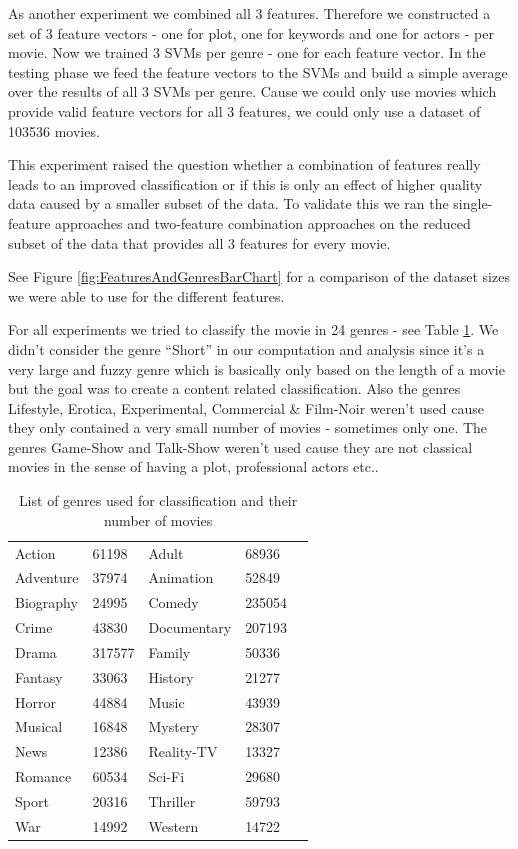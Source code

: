 \documentclass{vldb}
\begin{document}
\par As another experiment we combined all 3 features. Therefore we constructed a set of 3 feature vectors - one for plot, one for keywords and one for actors - per movie. Now we trained 3 SVMs per genre - one for each feature vector. In the testing phase we feed the feature vectors to the SVMs and build a simple average over the results of all 3 SVMs per genre. Cause we could only use movies which provide valid feature vectors for all 3 features, we could only use a dataset of 103536 movies.

\par This experiment raised the question whether a combination of features really leads to an improved classification or if this is only an effect of higher quality data caused by a smaller subset of the data. To validate this we ran the single-feature approaches and two-feature combination approaches on the reduced subset of the data that provides all 3 features for every movie.

\par See Figure \ref{fig:FeaturesAndGenresBarChart} for a comparison of the dataset sizes we were able to use for the different features.

\par For all experiments we tried to classify the movie in 24 genres - see Table \ref{genre-list}. We didn't consider the genre “Short” in our computation and analysis since it's a very large and fuzzy genre which is basically only based on the length of a movie but the goal was to create a content related classification. Also the genres Lifestyle, Erotica, Experimental, Commercial \& Film-Noir weren't used cause they only contained a very small number of movies - sometimes only one. The genres Game-Show and Talk-Show weren't used cause they are not classical movies in the sense of having a plot, professional actors etc..

\begin{table}[]
\centering
\caption{List of genres used for classification and their number of movies}
\label{genre-list}
\begin{tabular}{lllll}
Action & 61198 & Adult & 68936\\
Adventure & 37974 & Animation & 52849\\
Biography & 24995 & Comedy & 235054\\
Crime & 43830 & Documentary & 207193\\
Drama & 317577 & Family & 50336\\
Fantasy & 33063 & History & 21277\\
Horror & 44884 & Music & 43939\\
Musical & 16848 & Mystery & 28307\\
News & 12386 & Reality-TV & 13327\\
Romance & 60534 & Sci-Fi & 29680\\
Sport & 20316 & Thriller & 59793\\
War & 14992 & Western & 14722\\
\end{tabular}
\end{table}
\end{document}
